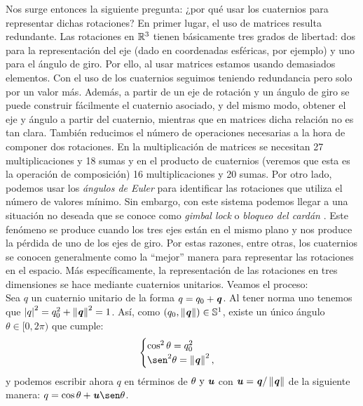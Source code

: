 		Nos surge entonces la siguiente pregunta: ¿por qué usar los cuaternios para representar dichas rotaciones? En primer lugar, el uso de matrices resulta redundante. Las rotaciones en $ \mathbb{R}^3 $ tienen básicamente tres grados de libertad: dos para la representación del eje (dado en coordenadas esféricas, por ejemplo) y uno para el ángulo de giro. Por ello, al usar matrices estamos usando demasiados elementos. Con el uso de los cuaternios seguimos teniendo redundancia pero solo por un valor más. Además, a partir de un eje de rotación y un ángulo de giro se puede construir fácilmente el cuaternio asociado, y del mismo modo, obtener el eje y ángulo a partir del cuaternio, mientras que en matrices dicha relación no es tan clara.  También reducimos el número de operaciones necesarias a la hora de componer dos rotaciones. En la multiplicación de matrices se necesitan 27 multiplicaciones y 18 sumas y en el producto de cuaternios (veremos que esta es la operación de composición) 16 multiplicaciones y 20 sumas. Por otro lado, podemos usar los \textit{ángulos de Euler} para identificar las rotaciones que utiliza el número de valores mínimo. Sin embargo, con este sistema podemos llegar a una situación no deseada que se conoce como \textit{gimbal lock} o \textit{bloqueo del cardán} \cite{QuatPowerPoint}.  Este fenómeno se produce cuando los tres ejes están en el mismo plano y nos produce la pérdida de uno de los ejes de giro. Por estas razones, entre otras, los cuaternios se conocen generalmente como la ``mejor'' manera para representar las rotaciones en el espacio. Más específicamente, la representación de las rotaciones en tres dimensiones se hace mediante cuaternios unitarios. Veamos el proceso: \\
		
		Sea $ q $ un cuaternio unitario de la forma $ q = q_0 + \textbf{\emph{q}} $. Al tener norma uno tenemos que $ \left\vert q\right\vert^2 = q_0^2 + \left\Vert\textbf{\emph{q}}\right\Vert^2 = 1 $. Así, como $ (q_0, \left\Vert\textbf{\emph{q}}\right\Vert) \in \mathbb{S}^1 $, existe un único ángulo $ \theta \in \lbrack 0,2\pi ) $ que cumple: 	
		\begin{equation*}
			\begin{cases}
			 \cos^2 \theta = q_0^2 \\
			 \sen^2\theta = \norm{\qq}^2 ,
			\end{cases}
		\end{equation*}
		y podemos escribir ahora $ q $ en términos de $ \theta \text{ y } \textbf{\emph{u}}$ con $ \textbf{\emph{u}} = \mathbf{\textbf{\emph{q}}}/\left\Vert\textbf{\emph{q}}\right\Vert$ de la siguiente manera: $ q = \cos\theta + \uu\sen\theta $. \\
		
